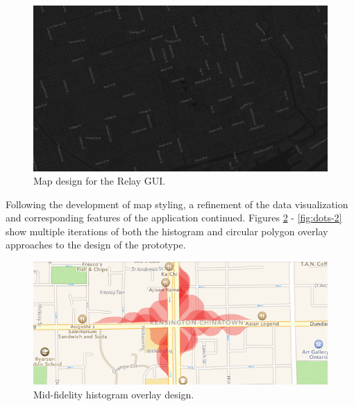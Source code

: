 \documentclass{article}
\begin{document}
\begin{figure}[htbp!]
  \begin{centering}
    \includegraphics[scale=0.35]{figures/map-style.png}
    \caption{Map design for the Relay GUI.}
    \label{fig:map-styling}
  \end{centering}
\end{figure}

Following the development of map styling, a refinement of the data visualization and corresponding features of the application continued.
Figures \ref{fig:histo-1} - \ref{fig:dots-2} show multiple iterations of both the histogram and circular polygon overlay approaches to the design of the prototype.\\

\begin{figure}[htbp!]
  \begin{centering}
    \includegraphics[scale=0.77]{figures/histo-1.png}
    \caption{Mid-fidelity histogram overlay design.}
    \label{fig:histo-1}
  \end{centering}
\end{figure}
\end{document}
